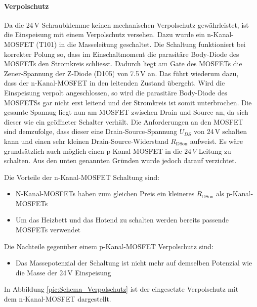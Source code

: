 \paragraph{Verpolschutz}
Da die 24\,V Schraubklemme keinen mechanischen Verpolschutz gewährleistet, ist die Einspeisung mit einem Verpolschutz versehen. Dazu wurde ein n-Kanal-MOSFET (T101) in die Masseleitung geschaltet. Die Schaltung funktioniert bei korrekter Polung so, dass im Einschaltmoment die parasitäre Body-Diode des MOSFETs den Stromkreis schliesst. Dadurch liegt am Gate des MOSFETs die Zener-Spannung der Z-Diode (D105) von 7.5\,V an. Das führt wiederum dazu, dass der n-Kanal-MOSFET in den leitenden Zustand übergeht. Wird die Einspeisung verpolt angeschlossen, so wird die parasitäre Body-Diode des MOSFETSs gar nicht erst leitend und der Stromkreis ist somit unterbrochen. Die gesamte Spannug liegt nun am MOSFET zwischen Drain und Source an, da sich dieser wie ein geöffneter Schalter verhält.
Die Anforderungen an den MOSFET sind demzufolge, dass dieser eine Drain-Source-Spannung $U_{DS}$ von 24\,V schalten kann und einen sehr kleinen Drain-Source-Widerstand $R_\text{DSon}$ aufweist. Es wäre grundsätzlich auch möglich einen p-Kanal-MOSFET in die $24 \,\si{V}$ Leitung zu schalten. Aus den unten genannten Gründen wurde jedoch darauf verzichtet.

Die Vorteile der n-Kanal-MOSFET Schaltung sind: 
\begin{itemize}
	\item N-Kanal-MOSFETs haben zum gleichen Preis ein kleineres $R_\text{DSon}$ als p-Kanal-MOSFETs
	\item Um das Heizbett und das Hotend zu schalten werden bereits passende MOSFETs verwendet
\end{itemize}

Die Nachteile gegenüber einem p-Kanal-MOSFET Verpolschutz sind: 
\begin{itemize}
	\item Das Massepotenzial der Schaltung ist nicht mehr auf demselben Potenzial wie die Masse der 24\,V Einspeisung
\end{itemize}

In Abbildung \ref{pic:Schema_Verpolschutz} ist der eingesetzte Verpolschutz mit dem n-Kanal-MOSFET dargestellt.


